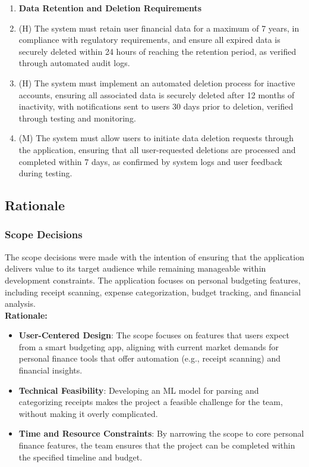 \documentclass[12pt]{article}
\begin{document}
\begin{enumerate}[label=NFR\arabic*]
  \item[] \textbf{Data Retention and Deletion Requirements}
  \item (H) The system must retain user financial data for a maximum of 7 years, 
  in compliance with regulatory requirements, and ensure all expired data is securely 
  deleted within 24 hours of reaching the retention period, as verified through 
  automated audit logs.
  \item (H) The system must implement an automated deletion process for inactive 
  accounts, ensuring all associated data is securely deleted after 12 months of 
  inactivity, with notifications sent to users 30 days prior to deletion, verified 
  through testing and monitoring.
  \item (M) The system must allow users to initiate data deletion requests through 
  the application, ensuring that all user-requested deletions are processed and 
  completed within 7 days, as confirmed by system logs and user feedback during testing.
  
\end{enumerate}


\newpage

\subsection{Rationale}

\subsubsection{Scope Decisions}
The scope decisions were made with the intention of ensuring that the
application delivers value to its target audience while remaining manageable
within development constraints. The application focuses on personal budgeting
features, including receipt scanning, expense categorization, budget tracking,
and financial analysis. \\

\noindent\textbf{Rationale:}
\begin{itemize}
    \item \textbf{User-Centered Design}: The scope focuses on features that
    users expect from a smart budgeting app, aligning with current market
    demands for personal finance tools that offer automation (e.g., receipt
    scanning) and financial insights. 
    \item \textbf{Technical Feasibility}: Developing an ML model for parsing and
    categorizing receipts makes the project a feasible challenge for the team,
    without making it overly complicated.
    \item \textbf{Time and Resource Constraints}: By narrowing the scope to core
    personal finance features, the team ensures that the project can be
    completed within the specified timeline and budget.
\end{itemize}
\end{document}
